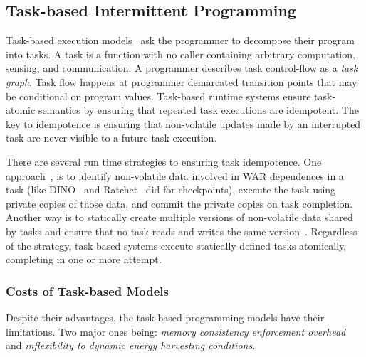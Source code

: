 \subsection{Task-based Intermittent Programming}
\label{section:background_task_computing}

Task-based execution models~\cite{dino,chain,alpaca} ask the programmer to decompose their program into tasks. A task is a function with no caller containing arbitrary computation, sensing, and communication. A programmer describes task control-flow as a {\em task graph}. Task flow happens at programmer demarcated transition points that may be conditional on program values. 
Task-based runtime systems ensure task-atomic semantics by ensuring that repeated task executions are idempotent. The key to idempotence is ensuring that non-volatile updates made by an interrupted task are never visible to a future task execution.  

There are several run time strategies to ensuring task idempotence. One approach~\cite{alpaca}, is to identify non-volatile data involved in WAR dependences in a task (like DINO~\cite{dino} and Ratchet~\cite{ratchet} did for checkpoints), execute the task using private copies of those data, and commit the private copies on task completion. Another way is to statically create multiple versions of non-volatile data shared by tasks and ensure that no task reads and writes the same version~\cite{chain}. Regardless of the strategy, task-based systems execute statically-defined tasks atomically, completing in one or more attempt. 

\subsubsection{Costs of Task-based Models}
\label{sec:cost_task-based}

Despite their advantages, the task-based programming models have their limitations. Two major ones being: {\em memory consistency enforcement overhead} and {\em inflexibility to dynamic energy harvesting conditions}.

